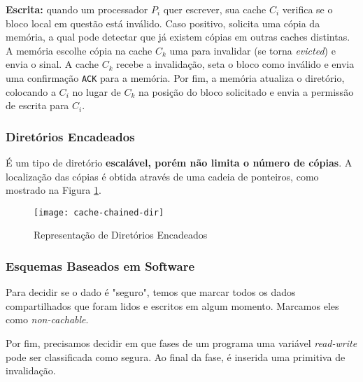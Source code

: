 \textbf{Escrita:} quando um processador $P_i$ quer escrever, sua cache $C_i$ verifica se o bloco local em questão está inválido. Caso positivo, solicita uma cópia da memória, a qual pode detectar que já existem cópias em outras caches distintas. A memória escolhe cópia na cache $C_k$ uma para invalidar (se torna \textit{evicted}) e envia o sinal. A cache $C_k$ recebe a invalidação, seta o bloco como inválido e envia uma confirmação \texttt{ACK} para a memória. Por fim, a memória atualiza o diretório, colocando a $C_i$ no lugar de $C_k$ na posição do bloco solicitado e envia a permissão de escrita para $C_i$.




\subsubsection{Diretórios Encadeados}
É um tipo de diretório \textbf{escalável, porém não limita o número de cópias}. A localização das cópias é obtida através de uma cadeia de ponteiros, como mostrado na Figura \ref{fig:cache-chained-dir}.

\begin{figure}[!ht]
  \centering
  \texttt{[image: cache-chained-dir]}
  \caption{Representação de Diretórios Encadeados}
  \label{fig:cache-chained-dir}
\end{figure}




\subsubsection{Esquemas Baseados em Software}
Para decidir se o dado é "seguro", temos que marcar todos os dados compartilhados que foram lidos e escritos em algum momento. Marcamos eles como \textit{non-cachable}.

Por fim, precisamos decidir em que fases de um programa uma variável \textit{read-write} pode ser classificada como segura. Ao final da fase, é inserida uma primitiva de invalidação.
